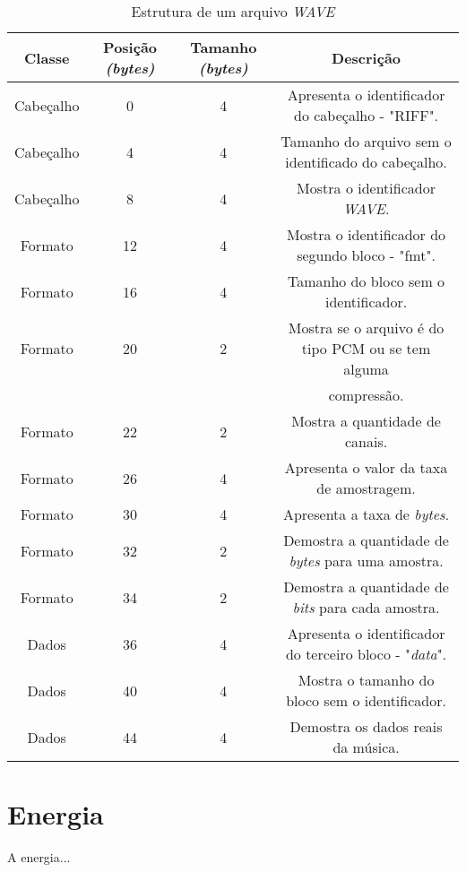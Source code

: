 \documentclass[a4paper,12pt,twoside,openright]{report}
\begin{document}
\begin{table}[h] 

	\caption{Estrutura de um arquivo \textit{WAVE}}
	\begin{tabular}{c|c|c|c}
		\textbf{Classe} & \textbf{Posi\c{c}\~{a}o \textit{(bytes)}} & \textbf{Tamanho \textit{(bytes)}} & \textbf{Descri\c{c}\~{a}o}\\
		\hline
		Cabe\c{c}alho & 0 & 4 & Apresenta o identificador do cabe\c{c}alho - "RIFF".\\
		Cabe\c{c}alho & 4 & 4 & Tamanho do arquivo sem o identificado do cabe\c{c}alho.\\
		Cabe\c{c}alho & 8 & 4 & Mostra o identificador \textit{WAVE}.\\
		\hline
		Formato & 12 & 4 & Mostra o identificador do segundo bloco - "fmt".\\
		Formato & 16 & 4 & Tamanho do bloco sem o identificador.\\
		Formato & 20 & 2 & Mostra se o arquivo \'{e} do tipo PCM ou se tem alguma \\ & & & compress\~{a}o.\\
		Formato & 22 & 2 & Mostra a quantidade de canais.\\
		Formato & 26 & 4 & Apresenta o valor da taxa de amostragem.\\
		Formato & 30 & 4 & Apresenta a taxa de \textit{bytes}.\\
		Formato & 32 & 2 & Demostra a quantidade de \textit{bytes} para uma amostra.\\
		Formato & 34 & 2 & Demostra a quantidade de \textit{bits} para cada amostra.\\
		\hline
		Dados & 36 & 4 & Apresenta o identificador do terceiro bloco - "\textit{data}".\\
		Dados & 40 & 4 & Mostra o tamanho do bloco sem o identificador.\\
		Dados & 44 & 4 & Demostra os dados reais da m\'{u}sica.
		
	\end{tabular}
\end{table}     



\section{Energia}
\label{energia}
\par A energia...
\end{document}
